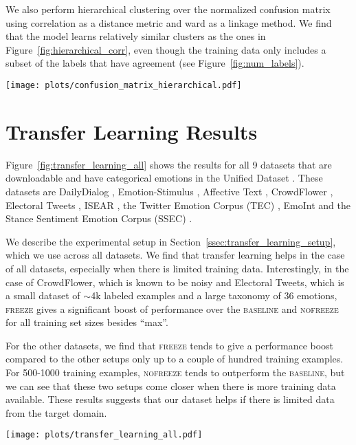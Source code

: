 \documentclass[11pt,a4paper]{article}
\begin{document}
We also perform hierarchical clustering over the normalized confusion matrix using correlation as a distance metric and ward as a linkage method. We find that the model learns relatively similar clusters as the ones in Figure~\ref{fig:hierarchical_corr}, even though the training data only includes a subset of the labels that have agreement (see Figure~\ref{fig:num_labels}).


\begin{figure*}[t!]
 \centering
   \centering
   \texttt{[image: plots/confusion\_matrix\_hierarchical.pdf]}
   \caption{A normalized confusion matrix for our model predictions. The plot shows that the model confuses emotions with other emotions that are related in intensity and sentiment.}
   \label{fig:confusion_matrix}
\end{figure*}

\section{Transfer Learning Results}
\label{sec:appendix_transfer_learning}

Figure~\ref{fig:transfer_learning_all} shows the results for all 9 datasets that are downloadable and have categorical emotions in the Unified Dataset \citep{unified-klinger2018analysis}. These datasets are DailyDialog \citep{li2017dailydialog}, Emotion-Stimulus \citep{ghazi2015detecting}, Affective Text \citep{affective-text-2007-semeval}, CrowdFlower \citep{crowdflower-2016}, Electoral Tweets \citep{electoraltweets-mohammad2015sentiment}, ISEAR \citep{scherer1994evidence}, the Twitter Emotion Corpus (TEC) \citep{tec-mohammad2012emotional}, EmoInt \citep{mohammad-etal-2018-semeval} and the Stance Sentiment Emotion Corpus (SSEC) \citep{schuff2017annotation}. 

We describe the experimental setup in Section~\ref{ssec:transfer_learning_setup}, which we use across all datasets. We find that transfer learning helps in the case of all datasets, especially when there is limited training data. Interestingly, in the case of CrowdFlower, which is known to be noisy \citep{unified-klinger2018analysis} and Electoral Tweets, which is a small dataset of $\sim$4k labeled examples and a large taxonomy of 36 emotions, \textsc{freeze} gives a significant boost of performance over the \textsc{baseline} and \textsc{nofreeze} for all training set sizes besides ``max''. 

For the other datasets, we find that \textsc{freeze} tends to give a performance boost compared to the other setups only up to a couple of hundred training examples. For 500-1000 training examples, \textsc{nofreeze} tends to outperform the \textsc{baseline}, but we can see that these two setups come closer when there is more training data available. These results suggests that our dataset helps if there is limited data from the target domain.



\begin{figure*}[t!]
 \centering
   \centering
   \texttt{[image: plots/transfer\_learning\_all.pdf]}
   \caption{Transfer learning results on 9 emotion benchmarks from the Unified Dataset \citep{unified-klinger2018analysis}.}
   \label{fig:transfer_learning_all}
\end{figure*}

 
\end{document}
